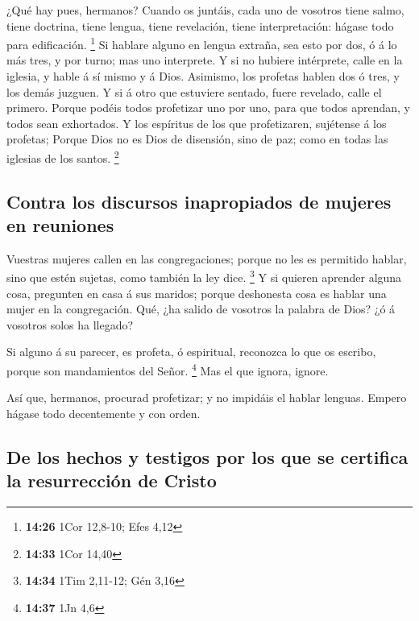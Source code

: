  ¿Qué hay pues, hermanos? Cuando os juntáis, cada uno de
vosotros tiene salmo, tiene doctrina, tiene lengua, tiene revelación,
tiene interpretación: hágase todo para edificación. \footnote{\textbf{14:26}
  1Cor 12,8-10; Efes 4,12}  Si hablare alguno en lengua
extraña, sea esto por dos, ó á lo más tres, y por turno; mas uno
interprete.  Y si no hubiere intérprete, calle en la
iglesia, y hable á sí mismo y á Dios.  Asimismo, los
profetas hablen dos ó tres, y los demás juzguen.  Y si á
otro que estuviere sentado, fuere revelado, calle el primero.
 Porque podéis todos profetizar uno por uno, para que todos
aprendan, y todos sean exhortados.  Y los espíritus de los
que profetizaren, sujétense á los profetas;  Porque Dios no
es Dios de disensión, sino de paz; como en todas las iglesias de los
santos. \footnote{\textbf{14:33} 1Cor 14,40}

\hypertarget{contra-los-discursos-inapropiados-de-mujeres-en-reuniones}{%
\subsection{Contra los discursos inapropiados de mujeres en
reuniones}\label{contra-los-discursos-inapropiados-de-mujeres-en-reuniones}}

 Vuestras mujeres callen en las congregaciones; porque no
les es permitido hablar, sino que estén sujetas, como también la ley
dice. \footnote{\textbf{14:34} 1Tim 2,11-12; Gén 3,16}  Y
si quieren aprender alguna cosa, pregunten en casa á sus maridos; porque
deshonesta cosa es hablar una mujer en la congregación. 
Qué, ¿ha salido de vosotros la palabra de Dios? ¿ó á vosotros solos ha
llegado?

 Si alguno á su parecer, es profeta, ó espiritual,
reconozca lo que os escribo, porque son mandamientos del Señor.
\footnote{\textbf{14:37} 1Jn 4,6}  Mas el que ignora,
ignore.

 Así que, hermanos, procurad profetizar; y no impidáis el
hablar lenguas.  Empero hágase todo decentemente y con
orden.

\hypertarget{de-los-hechos-y-testigos-por-los-que-se-certifica-la-resurrecciuxf3n-de-cristo}{%
\subsection{De los hechos y testigos por los que se certifica la
resurrección de
Cristo}\label{de-los-hechos-y-testigos-por-los-que-se-certifica-la-resurrecciuxf3n-de-cristo}}

